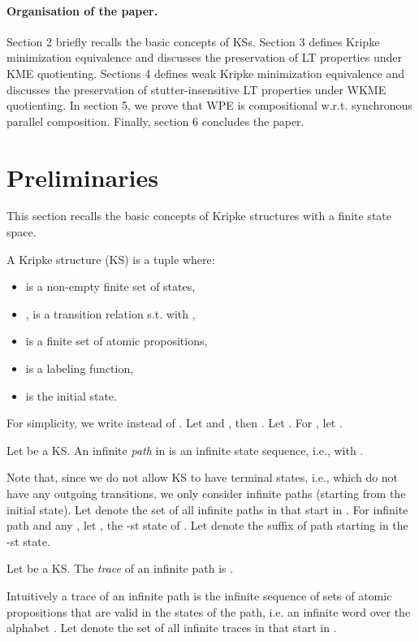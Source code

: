 \documentclass{llncs}
\newcommand{\<}{\langle}
\renewcommand{\>}{\rangle}
\begin{document}
\paragraph*{Organisation of the paper.}
Section 2 briefly recalls the basic concepts of KSs. 
Section 3 defines Kripke minimization equivalence and discusses the preservation of LT properties under KME quotienting. 
Sections 4 defines weak Kripke minimization equivalence and discusses the preservation of stutter-insensitive LT properties under WKME quotienting. In section 5, we prove that WPE is compositional w.r.t. synchronous parallel composition. Finally, section 6 concludes the paper.
\section{Preliminaries}
This section recalls the basic concepts of Kripke structures with a finite state space.  
\begin{definition}[KS]
A Kripke structure (KS) is a tuple  where:
\begin{itemize}
\item  is a non-empty finite set of states,
\item , is a transition relation s.t.  with ,
\item  is a finite set of atomic propositions,
\item  is a labeling function,
\item  is the initial state.
\end{itemize} 
\end{definition}
For simplicity, we write  instead of  . Let  and , then . Let . For , let . 
\begin{definition}[KS paths]
Let  be a KS. An infinite \emph{path}  in  is an infinite state sequence, i.e.,  with .
\end{definition}
Note that, since we do not allow KS  to have terminal states, i.e., which do not have any outgoing transitions, we only consider infinite paths (starting from the initial state).  
Let  denote the set of all infinite paths in  that start in . For infinite path  and any , let , the -st state of . Let  denote the suffix of path  starting in the -st state.
\begin{definition}[KS traces]
Let  be a KS. The \emph{trace} of an infinite path  is . 
\end{definition}
Intuitively a trace of an infinite path is the infinite sequence of sets of atomic propositions that are valid in the states of the path, i.e. an infinite word over the alphabet . Let  denote the set of all infinite traces in  that start in .
\end{document}
